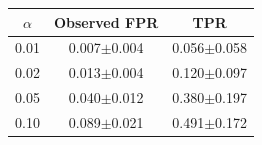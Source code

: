 \begin{tabular}{ccc}
\toprule
$\alpha$ & Observed FPR & TPR \\
\midrule
0.01 & 0.007$\pm$0.004 & 0.056$\pm$0.058 \\
0.02 & 0.013$\pm$0.004 & 0.120$\pm$0.097 \\
0.05 & 0.040$\pm$0.012 & 0.380$\pm$0.197 \\
0.10 & 0.089$\pm$0.021 & 0.491$\pm$0.172 \\
\bottomrule
\end{tabular}
